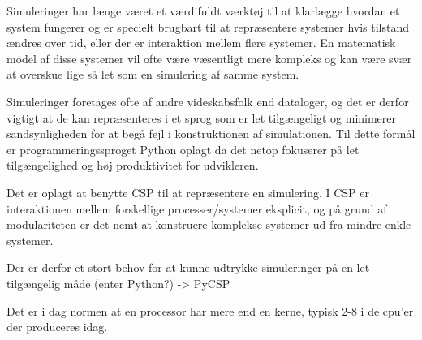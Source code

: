 Simuleringer har længe været et værdifuldt værktøj til at klarlægge hvordan et 
system fungerer og er specielt brugbart til at repræsentere systemer hvis 
tilstand ændres over tid, eller der er interaktion mellem flere systemer. En 
matematisk model af disse systemer vil ofte være væsentligt mere kompleks og 
kan være svær at overskue lige så let som en simulering af samme system. 

Simuleringer foretages ofte af andre videskabsfolk end dataloger, og det er 
derfor vigtigt at de kan repræsenteres i et sprog som er let tilgængeligt og 
minimerer sandsynligheden for at begå fejl i konstruktionen af simulationen.  
Til dette formål er programmeringssproget Python oplagt da det netop fokuserer 
på let tilgængelighed og høj produktivitet for udvikleren. 

Det er oplagt at benytte CSP\cite{hoare-csp} til at repræsentere en simulering.  
I CSP er interaktionen mellem forskellige processer/systemer eksplicit, og på 
grund af modulariteten er det nemt at konstruere komplekse systemer ud fra 
mindre enkle systemer. 



Der er derfor et stort behov for at kunne udtrykke simuleringer på en let 
tilgængelig måde (enter Python?) -> PyCSP



Det er i dag normen at en processor har mere end en kerne, typisk 2-8 i de 
cpu'er der produceres idag.  

